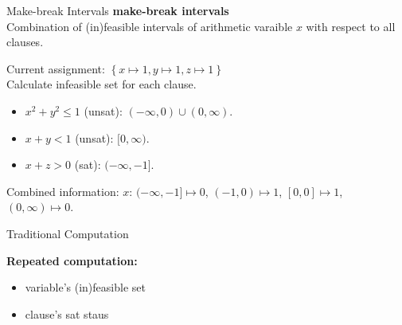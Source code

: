 \begin{frame}{Make-break Intervals}
    \textbf{make-break intervals} \\
    Combination of (in)feasible intervals of arithmetic varaible $x$ with respect to all clauses.

    \begin{example}
        Current assignment: $\left\{ x\mapsto 1, y\mapsto 1, z\mapsto 1 \right\}$ \\
        Calculate infeasible set for each clause.
        \begin{itemize}
            \item $x^2+y^2\le 1$ (unsat): $(-\infty, 0) \cup (0, \infty)$.
            \item $x+y<1$ (unsat): $[0,\infty)$.
            \item $x+z>0$ (sat): $(-\infty,-1]$.
        \end{itemize}
        Combined information: $x$: $(-\infty,-1]\mapsto 0$, $(-1,0)\mapsto 1$, $[0,0]\mapsto 1$, $(0,\infty)\mapsto 0$.
    \end{example}
\end{frame}

\begin{frame}{Traditional Computation}
    \begin{algorithm}[H]
        \SetAlgoLined
    \end{algorithm}
    
    \vspace{0.4cm}
    \textbf{Repeated computation:}\\
    \begin{itemize}
        \item variable's (in)feasible set
        \item clause's sat staus
    \end{itemize}

\end{frame}

